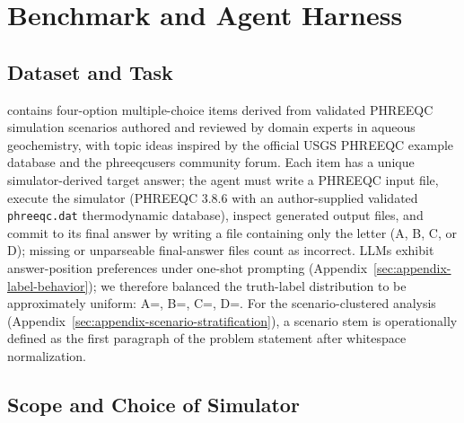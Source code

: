 \documentclass{article}
\begin{document}
\section{Benchmark and Agent Harness}
\label{sec:benchmark}

\subsection{Dataset and Task}

\BenchName{} contains \BenchN{} four-option multiple-choice items derived from \BenchScenarioN{} validated PHREEQC simulation scenarios authored and reviewed by domain experts in aqueous geochemistry, with topic ideas inspired by the official USGS PHREEQC example database and the phreeqcusers community forum. Each item has a unique simulator-derived target answer; the agent must write a PHREEQC input file, execute the simulator (PHREEQC 3.8.6 with an author-supplied validated \texttt{phreeqc.dat} thermodynamic database), inspect generated output files, and commit to its final answer by writing a file containing only the letter (A, B, C, or D); missing or unparseable final-answer files count as incorrect. LLMs exhibit answer-position preferences under one-shot prompting (Appendix~\ref{sec:appendix-label-behavior}); we therefore balanced the truth-label distribution to be approximately uniform: A=\BenchAlwaysA, B=\BenchAlwaysB, C=\BenchAlwaysC, D=\BenchAlwaysD. For the scenario-clustered analysis (Appendix~\ref{sec:appendix-scenario-stratification}), a scenario stem is operationally defined as the first paragraph of the problem statement after whitespace normalization.

\subsection{Scope and Choice of Simulator}
\end{document}
